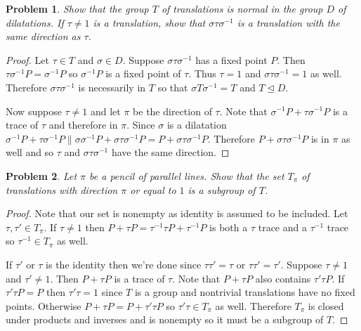 \documentclass{article}
\newtheorem{problem}{Problem}
\begin{document}
\begin{problem}
Show that the group $T$ of translations is normal in the group $D$ of dilatations. If $\tau \neq 1$ is a translation, show that $\sigma \tau \sigma^{-1}$ is a translation with the same direction as $\tau$.
\end{problem}
\begin{proof}
Let $\tau \in T$ and $\sigma \in D$. Suppose $\sigma \tau \sigma^{-1}$ has a fixed point $P$. Then $\tau \sigma^{-1}P = \sigma^{-1}P$ so $\sigma^{-1}P$ is a fixed point of $\tau$. Thus $\tau = 1$ and $\sigma \tau \sigma^{-1} = 1$ as well. Therefore $\sigma \tau \sigma^{-1}$ is necessarily in $T$ so that $\sigma T \sigma^{-1} = T$ and $T \unlhd D$.

Now suppose $\tau \neq 1$ and let $\pi$ be the direction of $\tau$. Note that $\sigma^{-1}P + \tau \sigma^{-1}P$ is a trace of $\tau$ and therefore in $\pi$. Since $\sigma$ is a dilatation $\sigma^{-1}P + \tau \sigma^{-1}P \parallel \sigma \sigma^{-1} P + \sigma \tau \sigma^{-1}P = P + \sigma \tau \sigma^{-1}P$. Therefore $P + \sigma \tau \sigma^{-1}P$ is in $\pi$ as well and so $\tau$ and $\sigma \tau \sigma^{-1}$ have the same direction.
\end{proof}

\begin{problem}
Let $\pi$ be a pencil of parallel lines. Show that the set $T_{\pi}$ of translations with direction $\pi$ or equal to $1$ is a subgroup of $T$.
\end{problem}
\begin{proof}
Note that our set is nonempty as identity is assumed to be included. Let $\tau, \tau' \in T_{\pi}$. If $\tau \neq 1$ then $P + \tau P = \tau^{-1} \tau P + \tau^{-1} P$ is both a $\tau$ trace and a $\tau^{-1}$ trace so $\tau^{-1} \in T_{\pi}$ as well.

If $\tau'$ or $\tau$ is the identity then we're done since $\tau \tau' = \tau$ or $\tau \tau' = \tau'$. Suppose $\tau \neq 1$ and $\tau' \neq 1$. Then $P + \tau P$ is a trace of $\tau$. Note that $P + \tau P$ also contains $\tau' \tau P$. If $\tau' \tau P = P$ then $\tau' \tau = 1$ since $T$ is a group and nontrivial translations have no fixed points. Otherwise $P + \tau P = P + \tau'\tau P$ so $\tau' \tau \in T_{\pi}$ as well. Therefore $T_{\pi}$ is closed under products and inverses and is nonempty so it must be a subgroup of $T$.
\end{proof}
\end{document}
